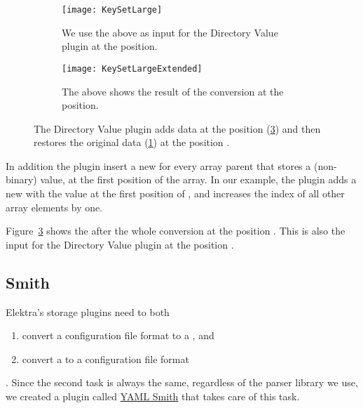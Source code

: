 \begin{figure}[H]
  \centering
  \begin{subfigure}[t]{.4\textwidth}
    \texttt{[image: KeySetLarge]}
    \caption{We use the  above as input for the Directory Value plugin at the  position.}
    \label{fig:keyset_large}
  \end{subfigure}
  \qquad
  \begin{subfigure}[t]{.48\textwidth}
    \texttt{[image: KeySetLargeExtended]}
    \caption{The  above shows the result of the conversion at the  position.}
    \label{fig:keyset_large_extended}
  \end{subfigure}
  \caption{The Directory Value plugin adds data at the position  (\ref{fig:keyset_large_extended}) and then restores the original data (\ref{fig:keyset_large}) at the position .}
\end{figure}

In addition the plugin insert a new  for every array parent that stores a (non-binary) value, at the first position of the array. In our example, the plugin adds a new  with the value  at the first position of , and increases the index of all other array elements by one.

Figure~\ref{fig:keyset_large_extended} shows the  after the whole conversion at the position . This  is also the input for the Directory Value plugin at the position .

\subsection{ Smith}

Elektra’s storage plugins need to both

\begin{enumerate}
  \item convert a configuration file format to a , and
  \item convert a  to a configuration file format
\end{enumerate}

. Since the second task is always the same, regardless of the parser library we use, we created a plugin called \href{http://libelektra.org/plugins/yamlsmith}{YAML Smith} that takes care of this task.

